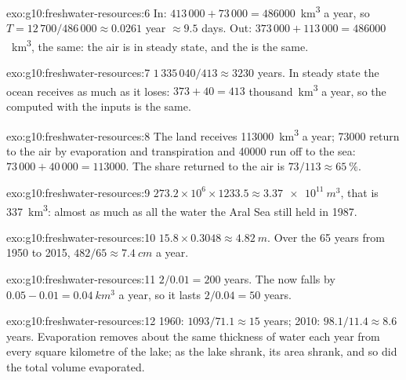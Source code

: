 \begin{solution}{exo:g10:freshwater-resources:6}
In: $413\,000 + 73\,000 = \num{486000}$~\unit{km^3} a year, so
$T = 12\,700/486\,000 \approx \num{0.0261}$ year $\approx \num{9.5}$ days.
Out: $373\,000 + 113\,000 = \num{486000}$~\unit{km^3}, the same: the air is in
steady state, and the  is the same.
\end{solution}

\begin{solution}{exo:g10:freshwater-resources:7}
$1\,335\,040/413 \approx \num{3230}$ years. In steady state the ocean
receives as much as it loses: $373 + 40 = 413$ thousand~\unit{km^3} a year,
so the  computed with the inputs is the same.
\end{solution}

\begin{solution}{exo:g10:freshwater-resources:8}
The land receives \num{113000}~\unit{km^3} a year; \num{73000} return to the
air by evaporation and transpiration and \num{40000} run off to the sea:
$73\,000 + 40\,000 = \num{113000}$. The share returned to the air is
$73/113 \approx \qty{65}{\percent}$.
\end{solution}

\begin{solution}{exo:g10:freshwater-resources:9}
$273.2 \times 10^6 \times 1233.5 \approx \qty{3.37e11}{m^3}$, that is
\qty{337}{km^3}: almost as much as all the water the Aral Sea still held in
1987.
\end{solution}

\begin{solution}{exo:g10:freshwater-resources:10}
$15.8 \times 0.3048 \approx \qty{4.82}{m}$. Over the 65 years from 1950 to
2015, $482/65 \approx \qty{7.4}{cm}$ a year.
\end{solution}

\begin{solution}{exo:g10:freshwater-resources:11}
$2/0.01 = 200$ years. The  now falls by $0.05 - 0.01 =
\qty{0.04}{km^3}$ a year, so it lasts $2/0.04 = 50$ years.
\end{solution}

\begin{solution}{exo:g10:freshwater-resources:12}
1960: $1093/71.1 \approx 15$ years; 2010: $98.1/11.4 \approx 8.6$ years.
Evaporation removes about the same thickness of water each year from every
square kilometre of the lake; as the lake shrank, its area shrank, and so did
the total volume evaporated.
\end{solution}

